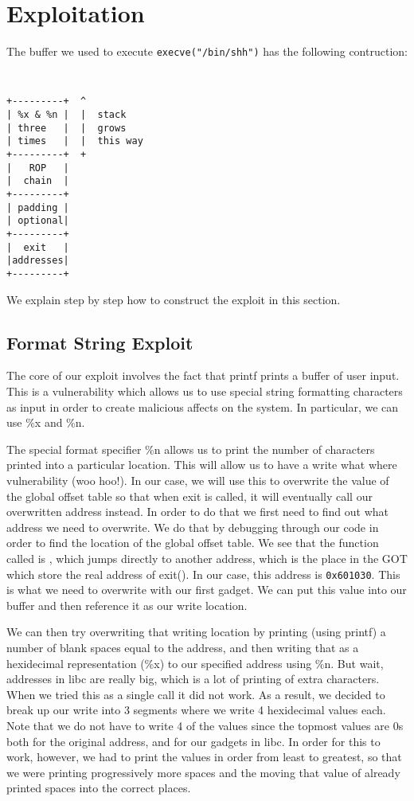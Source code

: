 \section{Exploitation}
The buffer we used to execute {\tt execve("/bin/shh")} has the following contruction:

{\tt \small
\begin{verbatim}
+---------+  ^
| %x & %n |  |  stack
| three   |  |  grows
| times   |  |  this way
+---------+  +
|   ROP   |
|  chain  |
+---------+
| padding |
| optional|
+---------+
|  exit   |
|addresses|
+---------+
\end{verbatim}
}

We explain step by step how to construct the exploit in this section.
\subsection{Format String Exploit}
The core of our exploit involves the fact that printf prints a buffer of user input. This is a vulnerability which allows us to use special string formatting characters as input in order to create malicious affects on the system. In particular, we can use \%x and \%n. 

The special format specifier \%n allows us to print the number of characters printed into a particular location. This will allow us to have a write what where vulnerability (woo hoo!). In our case, we will use this to overwrite the value of the global offset table so that when exit is called, it will eventually call our overwritten address instead. In order to do that we first need to find out what address we need to overwrite. We do that by debugging through our code in order to find the location of the global offset table.  We see that the function called is {\tt <exit@plt>}, which jumps directly to another address, which is the place in the GOT which store the real address of exit(). In our case, this address is {\tt 0x601030}. This is what we need to overwrite with our first gadget. We can put this value into our buffer and then reference it as our write location. 

We can then try overwriting that writing location by printing (using printf) a number of blank spaces equal to the address, and then writing that as a hexidecimal representation (\%x) to our specified address using \%n. But wait, addresses in libc are really big, which is a lot of printing of extra characters. When we tried this as a single call it did not work. As a result, we decided to break up our write into 3 segments where we write 4 hexidecimal values each. Note that we do not have to write 4 of the values since the topmost values are 0s both for the original address, and for our gadgets in libc. In order for this to work, however, we had to print the values in order from least to greatest, so that we were printing progressively more spaces and the moving that value of already printed spaces into the correct places.

